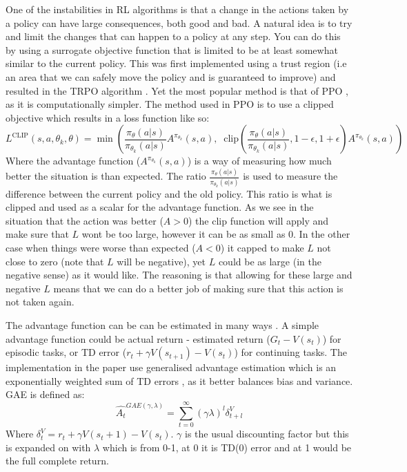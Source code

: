 One of the instabilities in RL algorithms is that a change in the actions taken by a policy can have large consequences, both good and bad. A natural idea is to try and limit the changes that can happen to a policy at any step. You can do this by using a surrogate objective function that is limited to be at least somewhat similar to the current policy. This was first implemented using a trust region (i.e an area that we can safely move the policy and is guaranteed to improve) and resulted in the TRPO algorithm \cite{schulmanTrustRegionPolicy2017}. Yet the most popular method is that of PPO \cite{schulmanProximalPolicyOptimization2017}, as it is computationally simpler. The method used in PPO is to use a clipped objective which results in a loss function like so: 
\begin{equation}
L^{\text{CLIP}}(s,a,\theta_k,\theta) = \min\left(
\frac{\pi_{\theta}(a|s)}{\pi_{\theta_k}(a|s)}  A^{\pi_{\theta_k}}(s,a), \;\;
\text{clip}\left(\frac{\pi_{\theta}(a|s)}{\pi_{\theta_k}(a|s)}, 1 - \epsilon, 1+\epsilon \right) A^{\pi_{\theta_k}}(s,a)
\right)
\end{equation}
Where the advantage function ($A^{\pi_{\theta_{k}}}(s,a)$) is a way of measuring how much better the situation is than expected. The ratio $\frac{\pi_{\theta}(a|s)}{\pi_{\theta_{k}}(a|s)}$ is used to measure the difference between the current policy and the old policy. This ratio is what is clipped and used as a scalar for the advantage function. As we see in the situation that the action was better ($A>0$) the clip function will apply and make sure that $L$ wont be too large, however it can be as small as 0. In the other case when things were worse than expected ($A < 0$) it capped to make $L$ not close to zero (note that $L$ will be negative), yet $L$ could be as large (in the negative sense) as it would like. The reasoning is that allowing for these large and negative $L$ means that we can do a better job of making sure that this action is not taken again.

The advantage function can be can be estimated in many ways . A simple advantage function could be actual return - estimated return ($G_{t} - V(s_{t})$) for episodic tasks, or TD error ($r_{t}+\gamma V(s_{t+1})-V(s_{t})$) for continuing tasks. The implementation in the paper use generalised advantage estimation which is an exponentially weighted sum of TD errors \cite{schulmanHighDimensionalContinuousControl2015}, as it better balances bias and variance. GAE is defined as:
\begin{equation}
\hat{A_{t}}^{GAE(\gamma, \lambda)} = \sum_{t=0}^{\infty}(\gamma\lambda)^{l}\delta_{t+l}^{V}
\end{equation}
Where $\delta_{t}^{V}=r_{t}+\gamma V(s_{t}+1)-V(s_{t})$. $\gamma$ is the usual discounting factor but this is expanded on with $\lambda$ which is from 0-1, at 0 it is TD(0) error and at 1 would be the full complete return.

